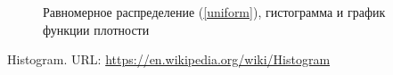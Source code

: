 \documentclass[12pt,a4paper]{article}
\begin{document}
\begin{figure}[h!]
\begin{minipage}[h]{0.3\linewidth}
		\end{minipage}
		\caption{Равномерное распределение (\ref{uniform}), гистограмма и график функции плотности}
		\label{ris:uniform}
	\end{figure}
	\clearpage
	\newpage
	
	\begin{flushleft}
		\begin{thebibliography}{1}
			  Histogram. URL: \url{https://en.wikipedia.org/wiki/Histogram}
		\end{thebibliography}
	\end{flushleft}
	
	
\end{document}
